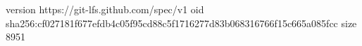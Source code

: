 version https://git-lfs.github.com/spec/v1
oid sha256:cf027181f677efdb4c05f95cd88c5f1716277d83b068316766f15c665a085fcc
size 8951
